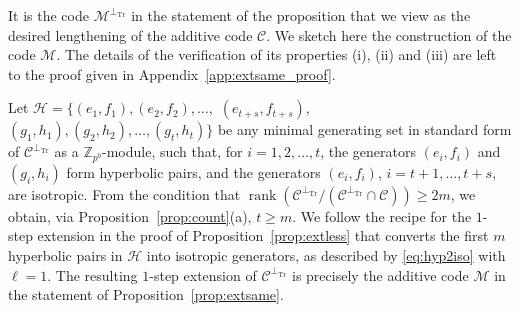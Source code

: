 \documentclass{article}
\DeclareMathOperator{\Tr}{Tr}
\DeclareMathOperator{\rank}{rank}
\theoremstyle{remark}
\theoremstyle{definition}
\numberwithin{equation}{section}
\begin{document}

It is the code $\mathcal{M}^{\perp_{\Tr}}$ in the statement of the proposition that we view as the desired lengthening of the additive code $\mathcal{C}$. We sketch here the construction of the code $\mathcal{M}$. The details of the verification of its properties (i), (ii) and (iii) are left to the proof given in Appendix~\ref{app:extsame_proof}.

Let $\mathcal{H}=\{(e_1,f_1),(e_2,f_2),\ldots, $ $(e_{t+s},f_{t+s}),$ $(g_1,h_1),(g_2,h_2),\ldots, (g_{t},h_{t})\}$ be any minimal generating set in standard form  of $\mathcal{C}^{\perp_{\Tr}}$  as a $\mathbb{Z}_{p^b}$-module,  such that, for $i = 1,2,\ldots,t$, the generators $(e_i,f_i)$ and $(g_i,h_i)$ form hyperbolic pairs, and the generators $(e_i,f_i)$, $i = t+1,\ldots,t+s$, are isotropic. From the condition that $\rank(\mathcal{C}^{\perp_{\Tr}}/(\mathcal{C}^{\perp_{\Tr}} \cap \mathcal{C})) \geq 2m$, we obtain, via Proposition~\ref{prop:count}(a), $t\geq m$. We follow the recipe for the $1$-step extension in the proof of Proposition~\ref{prop:extless} that converts the first $m$ hyperbolic pairs in $\mathcal{H}$ into isotropic generators, as described by \eqref{eq:hyp2iso} with $\ell = 1$. The resulting $1$-step extension of $\mathcal{C}^{\perp_{\Tr}}$ is precisely the additive code $\mathcal{M}$ in the statement of Proposition~\ref{prop:extsame}.
\end{document}
